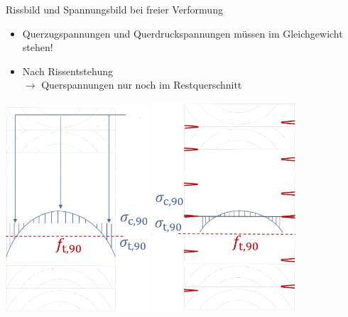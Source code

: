 \documentclass[fleqn,twoside]{article}
\begin{document}
        Rissbild und Spannungsbild bei freier Verformung\\
            \begin{minipage}{0.6\textwidth}
                \begin{itemize}
                    \item Querzugspannungen und Querdruckspannungen müssen im Gleichgewicht stehen! 
                    \item Nach Rissentstehung \\ $\rightarrow$ Querspannungen nur noch im Restquerschnitt
                \end{itemize}
            \end{minipage}
            \begin{minipage}{0.4\textwidth}
                \includegraphics[width=0.4\textwidth]{Grafiken/Holzfeuchte/Risse Spannung 01.png}
                \includegraphics[width=0.4\textwidth]{Grafiken/Holzfeuchte/Risse Spannung 02.png}
            \end{minipage}
\end{document}

